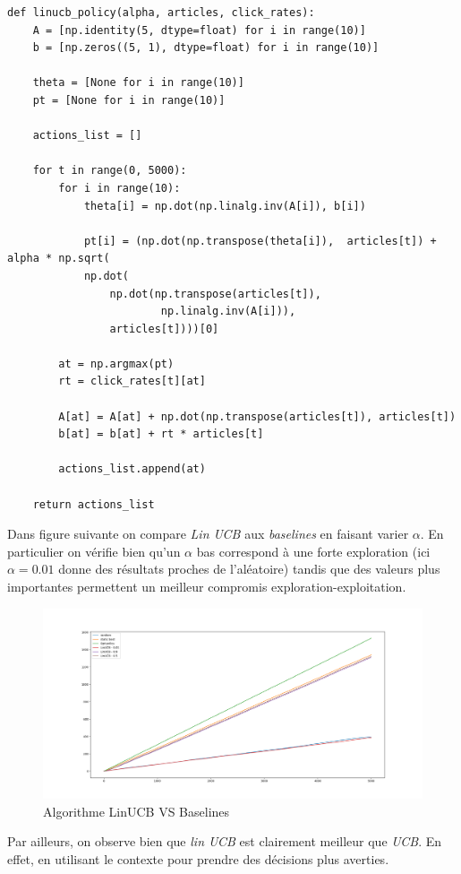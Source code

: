 \documentclass[french]{article}
\begin{document}
	\begin{verbatim}
def linucb_policy(alpha, articles, click_rates):
	A = [np.identity(5, dtype=float) for i in range(10)]
	b = [np.zeros((5, 1), dtype=float) for i in range(10)]

	theta = [None for i in range(10)]
	pt = [None for i in range(10)]

	actions_list = []

	for t in range(0, 5000):
		for i in range(10):
			theta[i] = np.dot(np.linalg.inv(A[i]), b[i])

			pt[i] = (np.dot(np.transpose(theta[i]),  articles[t]) + alpha * np.sqrt(
			np.dot(
				np.dot(np.transpose(articles[t]),
						np.linalg.inv(A[i])),
				articles[t])))[0]

		at = np.argmax(pt)
		rt = click_rates[t][at]

		A[at] = A[at] + np.dot(np.transpose(articles[t]), articles[t])
		b[at] = b[at] + rt * articles[t]

		actions_list.append(at)

	return actions_list
	\end{verbatim}
	
	Dans figure suivante on compare \emph{Lin UCB} aux \emph{baselines} en faisant varier $\alpha$. En particulier on vérifie bien qu'un $\alpha$ bas correspond à une forte exploration (ici $\alpha = 0.01$ donne des résultats proches de l'aléatoire) tandis que des valeurs plus importantes permettent un meilleur compromis exploration-exploitation.
	
	\begin{figure}[H]

			\centering
			\includegraphics[scale=0.3]{img/lin_ucb.png}
			\caption{Algorithme LinUCB VS Baselines}

	\end{figure}

Par ailleurs, on observe bien que \emph{lin UCB} est clairement meilleur que \emph{UCB}. En effet, en utilisant le contexte pour prendre des décisions plus averties. 
\end{document}
